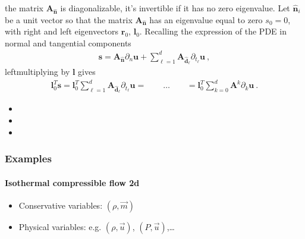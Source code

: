 \documentclass[letterpaper,10pt,english]{jupyterBook}
\begin{document}
\sphinxAtStartPar
{} the matrix \(\mathbf{A}_{\hat{\mathbf{n}}}\) is diagonalizable, it’s invertible if it has no zero eigenvalue. Let \(\hat{\mathbf{n}}_i\) be a unit vector so that the matrix \(\mathbf{A}_{\hat{\mathbf{n}}}\) has an eigenvalue equal to zero \(s_0 = 0\), with right and left eigenvectors \(\mathbf{r}_0\), \(\mathbf{l}_0\). Recalling the expression of the PDE in normal and tangential components
\begin{equation*}
\begin{split}\mathbf{s} = \mathbf{A}_{\hat{\mathbf{n}}} \partial_n \mathbf{u} + \sum_{\ell=1}^{d} \mathbf{A}_{\hat{\mathbf{d}}_\ell} \partial_{t_\ell} \mathbf{u} \ ,\end{split}
\end{equation*}
\sphinxAtStartPar
left\sphinxhyphen{}multiplying by \(\mathbf{l}\) gives
\begin{equation*}
\begin{split}\mathbf{l}^T_0 \mathbf{s} = \mathbf{l}_0^T \sum_{\ell=1}^{d} \mathbf{A}_{\hat{\mathbf{d}}_\ell} \partial_{t_\ell} \mathbf{u} = \qquad \dots \qquad = \mathbf{l}_0^T \sum_{k=0}^{d} \mathbf{A}^k \partial_k \mathbf{u} \ .\end{split}
\end{equation*}
\sphinxAtStartPar
{}
\begin{itemize}
\item {} 
\sphinxAtStartPar
{}

\item {} 
\sphinxAtStartPar
{}

\item {} 
\sphinxAtStartPar
{}

\end{itemize}


\subsubsection{Examples}
\label{\detokenize{ch/pde/characteristics:examples}}

\paragraph{Isothermal compressible flow \sphinxhyphen{} 2d}
\label{\detokenize{ch/pde/characteristics:isothermal-compressible-flow-2d}}\begin{itemize}
\item {} 
\sphinxAtStartPar
Conservative variables: \((\rho, \vec{m})\)

\item {} 
\sphinxAtStartPar
Physical variables: e.g. \((\rho, \vec{u})\), \((P, \vec{u})\),…

\end{itemize}
\end{document}

